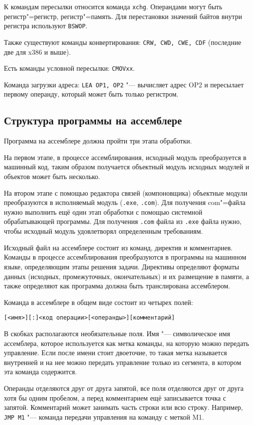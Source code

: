 К командам пересылки относится команда \verb|xchg|. Операндами могут быть регистр"=регистр, регистр"=память.
Для перестановки значений байтов внутри регистра используют \verb|BSWOP|.

Также существуют команды конвертирования: \verb|CRW, CWD, CWE, CDF| (последние две для x386 и выше).

Есть команды условной пересылки: \verb|CMOVxx|.

Команда загрузки адреса: \verb|LEA OP1, OP2| "--- вычисляет адрес OP2 и пересылает первому операнду,
который может быть только регистром.

\subsection{Структура программы на ассемблере}

Программа на ассемблере должна пройти три этапа обработки.

На первом этапе, в процессе ассемблирования, исходный модуль преобразуется в машинный
код, таким образом получается объектный модуль исходных модулей и объектов может быть
несколько.

На втором этапе с помощью редактора связей (компоновщика) объектные модули преобразуются
в исполняемый модуль (\verb|.exe|, \verb|.com|). Для получения com"=файла нужно выполнить ещё один
этап обработки с помощью системной обрабатывающей программы. Для получения \verb|.com| файла
из \verb|.exe| файла нужно, чтобы исходный модуль удовлетворял определенным требованиям.

Исходный файл на ассемблере состоит из команд, директив и комментариев. Команды
в процессе ассемблирования преобразуются в программы на машинном языке, определяющим
этапы решения задачи. Директивы определяют форматы данных (исходных, промежуточных, окончательных)
и их размещение в памяти, а также определяют как программа должна быть транслирована ассемблером.

Команда в ассемблере в общем виде состоит из четырех полей:

\verb|[<имя>][:]<код операции>[<операнды>][комментарий]|

В скобках располагаются необязательные поля. Имя "--- символическое имя ассемблера, которое
используется как метка команды, на которую можно передать управление. Если после
имени стоит двоеточие, то такая метка называется внутренней и на нее можно передать
управление только из сегмента, в котором эта команда содержится.

Операнды отделяются друг от друга запятой, все поля отделяются друг от друга хотя бы
одним пробелом, а перед комментарием ещё записывается точка с запятой. Комментарий
может занимать часть строки или всю строку.
Например, \verb|JMP M1| "--- команда передачи управления на команду с меткой M1.


